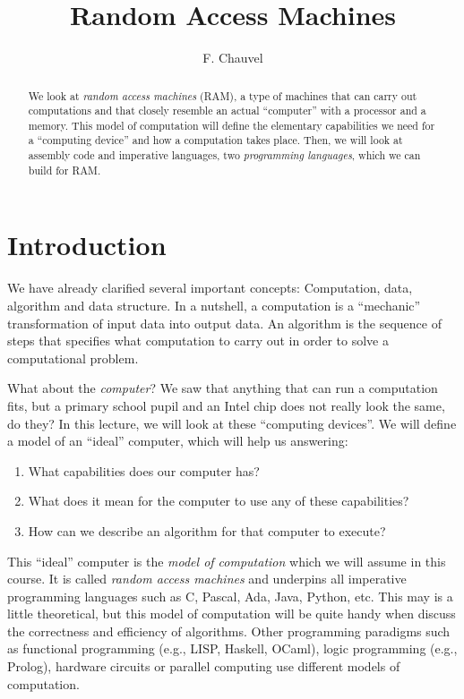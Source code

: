 \documentclass {aldast}
\title{Random Access Machines}
\author{F. Chauvel}
\begin{document}
\maketitle

\begin{abstract}
  We look at \emph{random access machines} (RAM), a type of machines
  that can carry out computations and that closely resemble an actual
  ``computer'' with a processor and a memory. This model of
  computation will define the elementary capabilities we need for a
  ``computing device'' and how a computation takes place. Then, we
  will look at assembly code and imperative languages, two
  \emph{programming languages}, which we can build for RAM.
\end{abstract}


\section*{Introduction}
We have already clarified several important concepts: Computation,
data, algorithm and data structure. In a nutshell, a computation is a
``mechanic'' transformation of input data into output data. An
algorithm is the sequence of steps that specifies what computation to carry
out in order to solve a computational problem.

What about the \emph{computer}? We saw that anything that can run a
computation fits, but a primary school pupil and an Intel chip does
not really look the same, do they?  In this lecture, we will look at
these ``computing devices''. We will define a model of an ``ideal''
computer, which will help us answering:
\begin{enumerate}
\item What capabilities does our computer has?
\item What does it mean for the computer to use any of these
  capabilities?
\item How can we describe an algorithm for that computer to execute?
\end{enumerate}

This ``ideal'' computer is the \emph{model of computation} which we
will assume in this course. It is called \emph{random access machines}
and underpins all imperative programming languages such as C, Pascal,
Ada, Java, Python, etc. This may is a little theoretical, but this
model of computation will be quite handy when discuss the correctness
and efficiency of algorithms. Other programming paradigms such as
functional programming (e.g., LISP, Haskell, OCaml), logic programming
(e.g., Prolog), hardware circuits or parallel computing use
different models of computation.
\end{document}
